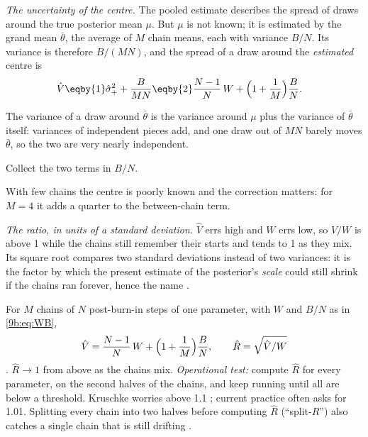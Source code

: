 \emph{The uncertainty of the centre.} The pooled estimate describes the spread of draws around
the true posterior mean $\mu$. But $\mu$ is not known; it is estimated by the grand mean
$\bar\theta$, the average of $M$ chain means, each with variance $B/N$. Its variance is therefore
$B/(MN)$, and the spread of a draw around the \emph{estimated} centre is
\begin{align*}
  \hat V
  &\eqby{1}\hat\sigma^2_+ +\frac{B}{MN}
   \eqby{2}\frac{N-1}{N}\,W+\Bigl(1+\frac1M\Bigr)\frac BN .
\end{align*}
\begin{explain}
  \item The variance of a draw around $\bar\theta$ is the variance around $\mu$ plus the variance
        of $\bar\theta$ itself: variances of independent pieces add, and one draw out of $MN$
        barely moves $\bar\theta$, so the two are very nearly independent.
  \item Collect the two terms in $B/N$.
\end{explain}
With few chains the centre is poorly known and the correction matters: for $M=4$ it adds a
quarter to the between-chain term.

\emph{The ratio, in units of a standard deviation.} $\hat V$ errs high and $W$ errs low, so
$\hat V/W$ is above 1 while the chains still remember their starts and tends to 1 as they mix.
Its square root compares two standard deviations instead of two variances: it is the factor by
which the present estimate of the posterior's \emph{scale} could still shrink if the chains ran
forever, hence the name \parencite{GelmanRubin1992}.

\begin{workdef}
For $M$ chains of $N$ post-burn-in steps of one parameter, with $W$ and $B/N$ as in
\eqref{9b:eq:WB},
\begin{equation}
  \hat V=\frac{N-1}{N}\,W+\Bigl(1+\frac1M\Bigr)\frac BN,
  \qquad
  \hat R=\sqrt{\hat V/W}
  \label{9b:eq:rhat}
\end{equation}
.
$\hat R\to1$ from above as the chains mix. \emph{Operational test:} compute $\hat R$ for every
parameter, on the second halves of the chains, and keep running until all are below a threshold.
Kruschke worries above 1.1 ; current practice often asks for 1.01.
Splitting every chain into two halves before computing $\hat R$ (``split-$\hat R$'') also catches
a single chain that is still drifting .
\end{workdef}

